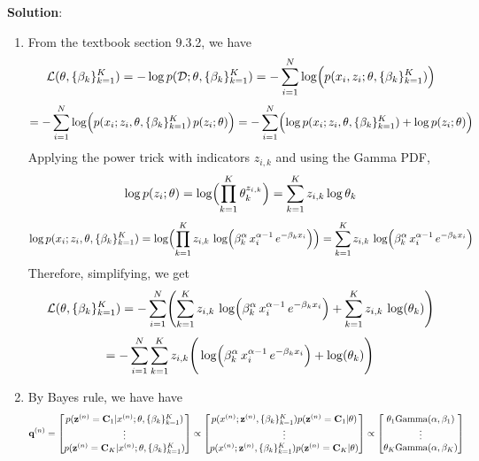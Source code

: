 \documentclass[submit]{../harvardml}
\newenvironment{solution}{
    \vspace{2mm}
    \color{blue}\noindent\textbf{Solution}:
}{}
\begin{document}
\begin{solution}
\begin{enumerate}
    \item From the textbook section 9.3.2, we have
    $$\mathcal{L}(\mathbf{\theta}, \{\beta_k\}^K_{k=1}) = -\log p(\mathcal D; \mathbf{\theta}, \{\beta_k\}^K_{k=1}) = - \sum_{i=1}^N \log\Bigl(p(x_i, z_i ; \mathbf{\theta}, \{\beta_k\}^K_{k=1})\Bigr)$$
    $$= -\sum_{i=1}^N \log\Bigl(p(x_i ; z_i, \mathbf{\theta}, \{\beta_k\}^K_{k=1})\,p(z_i;\mathbf{\theta})\Bigr)= -\sum_{i=1}^N \Bigl(\log p(x_i ; z_i,\mathbf{\theta},\{\beta_k\}^K_{k=1}) + \log p(z_i;\mathbf{\theta})\Bigr)$$
    Applying the power trick with indicators $z_{i,k}$ and using the Gamma PDF,
    $$\log p(z_i;\mathbf{\theta}) = \log\Bigl(\prod_{k=1}^K \theta_k^{z_{i,k}}\Bigr) = \sum_{k=1}^K z_{i,k} \log \theta_k$$
    $$\log p(x_i ; z_i,\mathbf{\theta},\{\beta_k\}^K_{k=1}) = \log \Bigl(\prod_{k=1}^K z_{i,k}\,\log\Bigl(\beta_k^{\alpha}\,x_i^{\alpha - 1}\,e^{-\beta_k x_i}\Bigr)\Bigr) = \sum_{k=1}^K z_{i,k}\,\log\Bigl(\beta_k^{\alpha}\,x_i^{\alpha - 1}\,e^{-\beta_k x_i}\Bigr)$$
    Therefore, simplifying, we get
    $$\mathcal{L}(\mathbf{\theta}, \{\beta_k\}^K_{k=1}) = -\sum_{i=1}^N \Biggl(\sum_{k=1}^K z_{i,k}\,\log\Bigl(\beta_k^{\alpha}\,x_i^{\alpha - 1}\,e^{-\beta_k x_i}\Bigr)+ \sum_{k=1}^K z_{i,k}\,\log(\theta_k)\Biggr)$$
    $$ = -\sum_{i=1}^N \sum_{k=1}^K z_{i,k} \Biggr( \log\Bigl(\beta_k^{\alpha}\,x_i^{\alpha - 1}\,e^{-\beta_k x_i}\Bigr)+ \log(\theta_k)\Biggr)$$
    \item By Bayes rule, we have have
    \begin{align*}
        \textbf{q}^{(n)} &= \begin{bmatrix}
        p(\mathbf{z}^{(n)} =\mathbf{C}_1| x^{(n)}; \mathbf{\theta}, \{ \beta_k \}^K_{k=1}) \\
        \vdots \\
        p(\mathbf{z}^{(n)} =\mathbf{C}_K| x^{(n)}; \mathbf{\theta}, \{ \beta_k \}^K_{k=1})
      \end{bmatrix} \propto \begin{bmatrix}
        p(x^{(n)};\mathbf{z}^{(n)}, \{ \beta_k \}^K_{k=1}) p(\mathbf{z}^{(n)} =\mathbf{C}_1| \mathbf{\theta}) \\
        \vdots \\
        p(x^{(n)};\mathbf{z}^{(n)}, \{ \beta_k \}^K_{k=1}) p(\mathbf{z}^{(n)} =\mathbf{C}_K| \mathbf{\theta}) 
      \end{bmatrix} \propto \begin{bmatrix}
        \theta_1 \text{Gamma}(\alpha, \beta_1) \\
        \vdots \\
        \theta_K \text{Gamma}(\alpha, \beta_K)
      \end{bmatrix}
    \end{align*}

\end{enumerate}
\end{solution}
\end{document}
